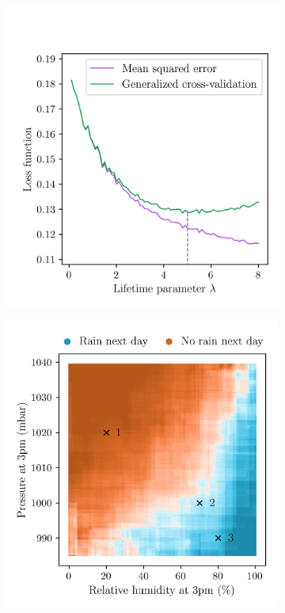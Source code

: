 \begin{figure}[t]
  \centering
  \begin{subfigure}{0.49\textwidth}
    \centering
    \includegraphics[scale=0.64]{graphics/weather_gcv.png}%
  \end{subfigure}
  \begin{subfigure}{0.49\textwidth}
    \centering
    \includegraphics[scale=0.64]{graphics/weather_debiased_forest_design.png}%

\end{subfigure}
\end{figure}
